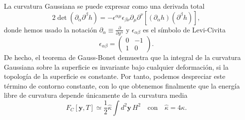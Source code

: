 La curvatura Gaussiana se puede expresar como una derivada total \cite{David:normal}
\begin{equation*}
2\det(\partial_{\alpha}\partial^{\beta}h)=
-\epsilon^{\alpha\mu}\epsilon_{\beta\nu}\partial_{\mu}\partial^{\nu}[(\partial_{\alpha}h)(\partial^{\beta}h)],
\end{equation*}
donde hemos usado la notación $\partial_{\alpha}\equiv\frac{\partial}{\partial
  y^{\alpha}}$ y $\epsilon_{\alpha\beta}$ es el símbolo de Levi-Civita
\begin{equation*}
\epsilon_{\alpha\beta}=\left(\begin{array}{cc}
0 & -1\\
1 & 0
\end{array}\right).
\end{equation*}
De hecho, el teorema de Gauss-Bonet\cite{David:geometria} demuestra que la integral de la curvatura
Gaussiana sobre la superficie es invariante bajo cualquier deformación, si la
topología de la superficie es constante. Por tanto, podemos despreciar este
término de contorno constante, con lo que obtenemos finalmente que la energía
libre de curvatura depende únicamente de la curvatura media 
\begin{equation}\label{ELandau_curvatura2}
F_C[\mathbf{y},T]\simeq\frac{1}{2}\hat{\kappa}\int d^2\mathbf{y}\, H^2 \quad
\text{con} \quad \hat{\kappa}=4\kappa.
\end{equation} 

